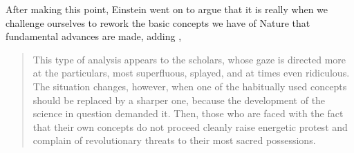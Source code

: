 \documentclass[11pt]{article}
\begin{document}
\begin{appendix}
After making this point, Einstein went on to argue that it is really when we challenge ourselves to rework the basic concepts we have of Nature that fundamental advances are made, adding \cite{Einstein1916},
\begin{quote}
%
This type of analysis appears to the scholars, whose gaze is directed more at the particulars, most superfluous, splayed, and at times even ridiculous. The situation changes, however, when one of the habitually used concepts should be replaced by a sharper one, because the development of the science in question demanded it. Then, those who are faced with the fact that their own concepts do not proceed cleanly raise energetic protest and complain of revolutionary threats to their most sacred possessions.
\end{quote}


\end{appendix}
\end{document}
